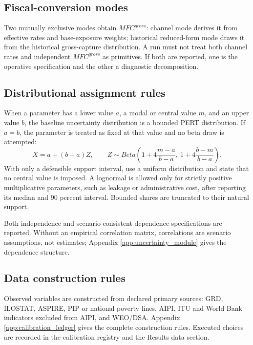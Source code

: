 \documentclass[11pt,a4paper]{article}
\begin{document}
\subsection{Fiscal-conversion modes}

Two mutually exclusive modes obtain $MFC^{gross}$: channel mode derives it from effective rates and base-exposure weights; historical reduced-form mode draws it from the historical gross-capture distribution. A run must not treat both channel rates and independent $MFC^{gross}$ as primitives. If both are reported, one is the operative specification and the other a diagnostic decomposition.

\subsection{Distributional assignment rules}

When a parameter has a lower value $a$, a modal or central value $m$, and an upper value $b$, the baseline uncertainty distribution is a bounded PERT distribution. If $a=b$, the parameter is treated as fixed at that value and no beta draw is attempted:
\begin{equation}
    X=a+(b-a)Z,
    \qquad
    Z\sim Beta\left(1+4\frac{m-a}{b-a},\ 1+4\frac{b-m}{b-a}\right).
\end{equation}
With only a defensible support interval, use a uniform distribution and state that no central value is imposed. A lognormal is allowed only for strictly positive multiplicative parameters, such as leakage or administrative cost, after reporting its median and 90 percent interval. Bounded shares are truncated to their natural support.

Both independence and scenario-consistent dependence specifications are reported. Without an empirical correlation matrix, correlations are scenario assumptions, not estimates; Appendix \ref{app:uncertainty_module} gives the dependence structure.

\subsection{Data construction rules}

Observed variables are constructed from declared primary sources: GRD, ILOSTAT, ASPIRE, PIP or national poverty lines, AIPI, ITU and World Bank indicators excluded from AIPI, and WEO/DSA. Appendix \ref{app:calibration_ledger} gives the complete construction rules. Executed choices are recorded in the calibration registry and the Results data section.
\end{document}
